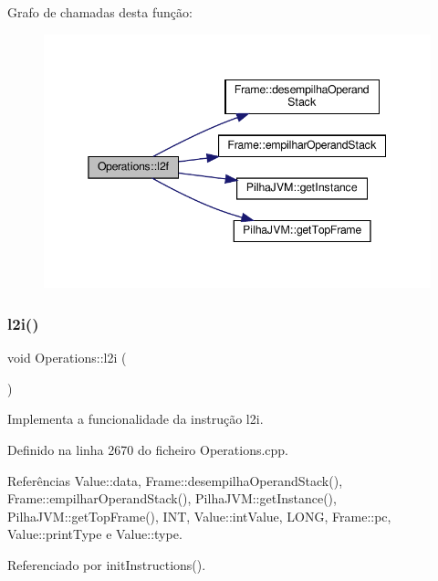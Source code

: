 Grafo de chamadas desta função\+:\nopagebreak
\begin{figure}[H]
\begin{center}
\leavevmode
\includegraphics[width=345pt]{classOperations_af2064cce9ba6f6a4be257354f21f537e_cgraph}
\end{center}
\end{figure}
\mbox{\label{classOperations_ad5820d99e67f4856e110685b775c5e9b}} 
\subsubsection{\texorpdfstring{l2i()}{l2i()}}
{\footnotesize\ttfamily void Operations\+::l2i (\begin{DoxyParamCaption}{ }\end{DoxyParamCaption})\hspace{0.3cm}{\ttfamily [private]}}



Implementa a funcionalidade da instrução l2i. 



Definido na linha 2670 do ficheiro Operations.\+cpp.



Referências Value\+::data, Frame\+::desempilha\+Operand\+Stack(), Frame\+::empilhar\+Operand\+Stack(), Pilha\+J\+V\+M\+::get\+Instance(), Pilha\+J\+V\+M\+::get\+Top\+Frame(), I\+NT, Value\+::int\+Value, L\+O\+NG, Frame\+::pc, Value\+::print\+Type e Value\+::type.



Referenciado por init\+Instructions().

